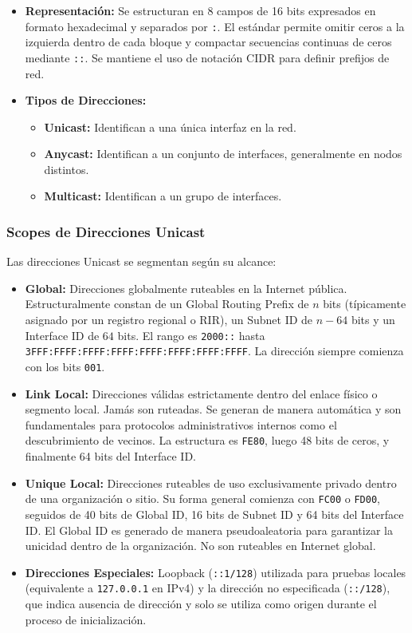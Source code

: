 \begin{itemize}
    \item \textbf{Representación:} Se estructuran en 8 campos de 16 bits expresados en formato hexadecimal y separados por \texttt{:}. El estándar permite omitir ceros a la izquierda dentro de cada bloque y compactar secuencias continuas de ceros mediante \texttt{::}. Se mantiene el uso de notación CIDR para definir prefijos de red.
    \item \textbf{Tipos de Direcciones:}
    \begin{itemize}
        \item \textbf{Unicast:} Identifican a una única interfaz en la red.
        \item \textbf{Anycast:} Identifican a un conjunto de interfaces, generalmente en nodos distintos.
        \item \textbf{Multicast:} Identifican a un grupo de interfaces.
    \end{itemize}
\end{itemize}

\subsubsection{Scopes de Direcciones Unicast}
Las direcciones Unicast se segmentan según su alcance:

\begin{itemize}
    \item \textbf{Global:} Direcciones globalmente ruteables en la Internet pública. Estructuralmente constan de un Global Routing Prefix de $n$ bits (típicamente asignado por un registro regional o RIR), un Subnet ID de $n-64$ bits y un Interface ID de $64$ bits. El rango es \texttt{2000::} hasta \texttt{3FFF:FFFF:FFFF:FFFF:FFFF:FFFF:FFFF:FFFF}. La dirección siempre comienza con los bits \texttt{001}.
    
    \item \textbf{Link Local:} Direcciones válidas estrictamente dentro del enlace físico o segmento local. Jamás son ruteadas. Se generan de manera automática y son fundamentales para protocolos administrativos internos como el descubrimiento de vecinos. La estructura es \texttt{FE80}, luego 48 bits de ceros, y finalmente 64 bits del Interface ID.
    \item \textbf{Unique Local:} Direcciones ruteables de uso exclusivamente privado dentro de una organización o sitio. Su forma general comienza con \texttt{FC00} o \texttt{FD00}, seguidos de 40 bits de Global ID, 16 bits de Subnet ID y 64 bits del Interface ID. El Global ID es generado de manera pseudoaleatoria para garantizar la unicidad dentro de la organización. No son ruteables en Internet global.
    \item \textbf{Direcciones Especiales:} Loopback (\texttt{::1/128}) utilizada para pruebas locales (equivalente a \texttt{127.0.0.1} en IPv4) y la dirección no especificada (\texttt{::/128}), que indica ausencia de dirección y solo se utiliza como origen durante el proceso de inicialización.
\end{itemize}

